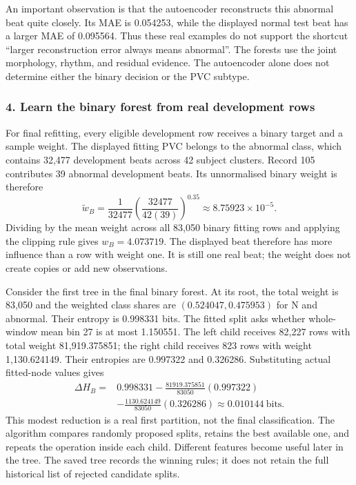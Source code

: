 An important observation is that the autoencoder reconstructs this abnormal
beat quite closely. Its MAE is 0.054253, while the displayed normal test
beat has a larger MAE of 0.095564. Thus these real examples do not support
the shortcut ``larger reconstruction error always means abnormal''. The
forests use the joint morphology, rhythm, and residual evidence. The
autoencoder alone does not determine either the binary decision or the PVC
subtype.

\subsubsection*{4. Learn the binary forest from real development rows}

For final refitting, every eligible development row receives a binary target
and a sample weight. The displayed fitting PVC belongs to the abnormal
class, which contains 32,477 development beats across 42 subject clusters.
Record 105 contributes 39 abnormal development beats. Its unnormalised
binary weight is therefore
\begin{equation}
 \widetilde w_B=\frac{1}{32477}
 \left(\frac{32477}{42(39)}\right)^{0.35}
 \approx8.75923\times10^{-5}.
 \label{eq:real-binary-weight}
\end{equation}
Dividing by the mean weight across all 83,050 binary fitting rows and applying
the clipping rule gives $w_B=4.073719$. The displayed beat therefore has
more influence than a row with weight one. It is still one real beat; the
weight does not create copies or add new observations.

Consider the first tree in the final binary forest. At its root, the total
weight is 83,050 and the weighted class shares are
$(0.524047,0.475953)$ for N and abnormal. Their entropy is 0.998331 bits.
The fitted split asks whether whole-window mean bin 27 is at most
1.150551. The left child receives 82,227 rows with total weight 81,919.375851;
the right child receives 823 rows with weight 1,130.624149. Their entropies
are 0.997322 and 0.326286. Substituting actual fitted-node values gives
\begin{equation}
 \begin{aligned}
 \Delta H_B={}&0.998331
 -\frac{81919.375851}{83050}(0.997322)\\
 &-\frac{1130.624149}{83050}(0.326286)
 \approx0.010144\ \text{bits}.
 \end{aligned}
 \label{eq:real-binary-root-gain}
\end{equation}
This modest reduction is a real first partition, not the final classification.
The algorithm compares randomly proposed splits, retains the best available
one, and repeats the operation inside each child. Different features become
useful later in the tree. The saved tree records the winning rules; it does
not retain the full historical list of rejected candidate splits.

